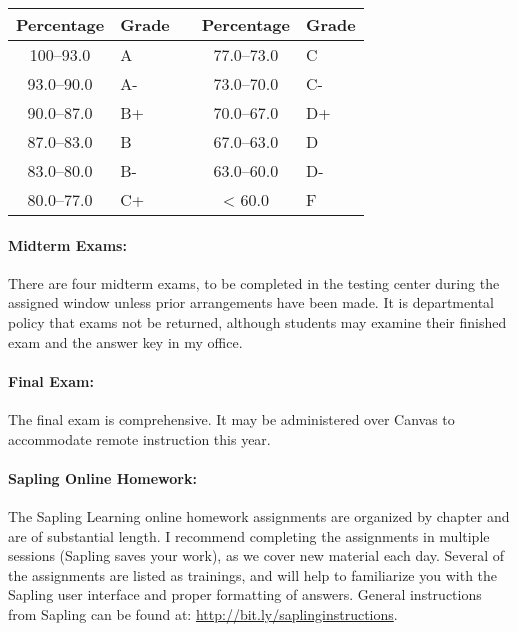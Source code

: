 \documentclass[12pt, letterpaper]{article}
\begin{document}
\begin{tabular}{cl|c|cl}
	Percentage & Grade &  & Percentage & Grade \\ \midrule
	100--93.0 & A     &  &  77.0--73.0 & C     \\
	93.0--90.0 & A-    &  &  73.0--70.0 & C-    \\
	90.0--87.0 & B+    &  &  70.0--67.0 & D+    \\
	87.0--83.0 & B     &  &  67.0--63.0 & D     \\
	83.0--80.0 & B-    &  &  63.0--60.0 & D-    \\
	80.0--77.0 & C+    &  &     < 60.0 & F
\end{tabular}
\paragraph{Midterm Exams:}
There are four midterm exams, to be completed in the testing center during the assigned window unless prior arrangements have been made. It is departmental policy that exams not be returned, although students may examine their finished exam and the answer key in my office.

\paragraph{Final Exam:}
The final exam is comprehensive. It may be administered over Canvas to accommodate remote instruction this year.

\paragraph{Sapling Online Homework:}
The Sapling Learning online homework assignments are organized by chapter and are of substantial length. I recommend completing the assignments in multiple sessions (Sapling saves your work), as we cover new material each day. Several of the assignments are listed as trainings, and will help to familiarize you with the Sapling user interface and proper formatting of answers.  General instructions from Sapling can be found at: \newline\href{ http://bit.ly/saplinginstructions}{ http://bit.ly/saplinginstructions}. 
\end{document}
